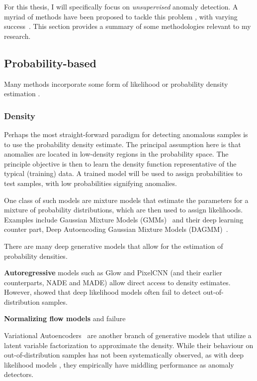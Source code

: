 For this thesis, I will specifically focus on \textit{unsupervised} anomaly detection. A myriad of methods have been proposed to tackle this problem \cite{pang_deep_2021,ruff_unifying_2021}, with varying success~\cite{han2022adbench}. This section provides a summary of some methodologies relevant to my research.

\subsection{Probability-based}

Many methods incorporate some form of likelihood or probability density estimation . 

\subsubsection*{Density}
Perhaps the most straight-forward paradigm for detecting anomalous samples is to use the probability density estimate. The principal assumption here is that anomalies are located in low-density regions in the probability space. The principle objective is then to learn the density function representative of the typical (training) data. A trained model will be used to assign probabilities to test samples, with low probabilities signifying anomalies.


One class of such models are mixture models that estimate the parameters for a mixture of probability distributions, which are then used to assign likelihoods.
Examples include Gaussian Mixture Models (GMMs)~\cite{reynolds2009gaussian} and their deep learning counter part, Deep Autoencoding Gaussian Mixture Models (DAGMM)~\cite{zong2018deep}.

There are many deep generative models that allow for the estimation of probability densities. 

\textbf{Autoregressive} models such as Glow and PixelCNN (and their earlier counterparts, NADE and MADE) allow direct access to density estimates. However, \cite{nalisnick2018do} showed that deep likelihood models often fail to detect out-of-distribution samples.

\textbf{Normalizing flow models} and failure


Variational Autoencoders~\cite{kingma2013auto} are another branch of generative models that utilize a latent variable factorization to approximate the density. While their behaviour on out-of-distribution samples has not been systematically observed, as with deep likelihood models , they empirically have middling performance as anomaly detectors.


